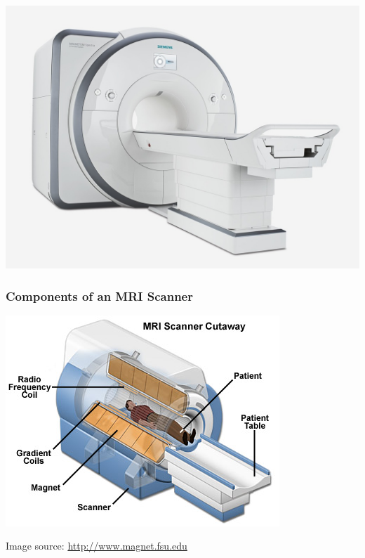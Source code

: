 \begin{frame}
    \begin{center}
        \includegraphics[height=0.9\textheight]{images/spectra}
    \end{center}
\end{frame}

\begin{frame}
	\frametitle{Components of an MRI Scanner}
	
	\begin{center}
		\includegraphics[height=0.8\textheight]{images/mri_scanner}
	\end{center}
	
	{\flushright
	\tiny Image source: \url{http://www.magnet.fsu.edu}}
\end{frame}

